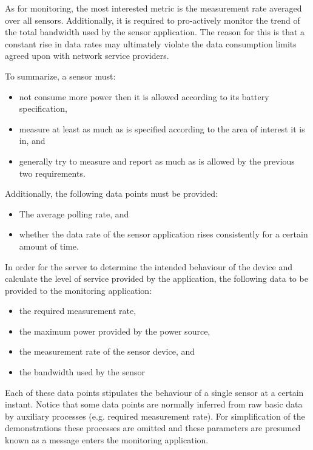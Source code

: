 As for monitoring, the most interested metric is the measurement rate averaged over all sensors. Additionally, it is required to pro-actively monitor the trend of the total bandwidth used by the sensor application. The reason for this is that a constant rise in data rates may ultimately violate the data consumption limits agreed upon with network service providers.

To summarize, a sensor must:
\begin{itemize}
\nospace
\item not consume more power then it is allowed according to its battery specification,
\item measure at least as much as is specified according to the area of interest it is in, and
\item generally try to measure and report as much as is allowed by the previous two requirements.
\end{itemize}
Additionally, the following data points must be provided:
\begin{itemize}
\nospace
\item The average polling rate, and
\item whether the data rate of the sensor application rises consistently for a certain amount of time.
\end{itemize}

In order for the server to determine the intended behaviour of the device and calculate the level of service provided by the application, the following data to be provided to the monitoring application:
\begin{itemize}
\nospace
\item the required measurement rate,
\item the maximum power provided by the power source,
\item the measurement rate of the sensor device, and
\item the bandwidth used by the sensor 
\end{itemize}
Each of these data points stipulates the behaviour of a single sensor at a certain instant. Notice that some data points are normally inferred from raw basic data by auxiliary processes (e.g. required measurement rate). For simplification of the demonstrations these processes are omitted and these parameters are presumed known as a message enters the monitoring application.


